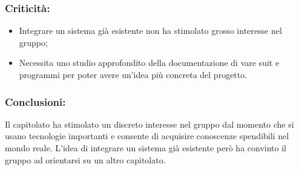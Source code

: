 		\subsubsection{Criticità:}
			\begin{itemize}
				\item Integrare un sistema già esistente non ha stimolato grosso interesse nel gruppo;
				\item Necessita uno studio approfondito della documentazione di vare suit e programmi per poter avere un'idea più concreta del progetto.
			\end{itemize}

		\subsubsection{Conclusioni:}
			Il capitolato ha stimolato un discreto interesse nel gruppo dal momento che si usano tecnologie importanti e consente di acquisire conoscenze spendibili nel mondo reale. L'idea di integrare un sistema già esistente però ha convinto il gruppo ad orientarsi su un altro capitolato.
